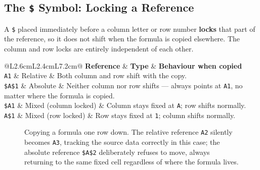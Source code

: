 \documentclass[11pt,a4paper]{article}
\begin{document}
\subsection{The \texttt{\$} Symbol: Locking a Reference}

A \texttt{\$} placed immediately before a column letter or row number \textbf{locks} that part of the reference, so it does not shift when the formula is copied elsewhere. The column and row locks are entirely independent of each other.

\begin{formulasyntax}
\begin{center}
\begin{tabular}{@{}L{2.6cm}L{2.4cm}L{7.2cm}@{}}
\toprule
\textbf{Reference} & \textbf{Type} & \textbf{Behaviour when copied} \\
\midrule
\texttt{A1} & Relative & Both column and row shift with the copy. \\
\texttt{\$A\$1} & Absolute & Neither column nor row shifts --- always points at \texttt{A1}, no matter where the formula is copied. \\
\texttt{\$A1} & Mixed (column locked) & Column stays fixed at \texttt{A}; row shifts normally. \\
\texttt{A\$1} & Mixed (row locked) & Row stays fixed at \texttt{1}; column shifts normally. \\
\bottomrule
\end{tabular}
\end{center}
\end{formulasyntax}

\begin{figure}[htbp]
\centering
{}
\caption{Copying a formula one row down. The relative reference \texttt{A2} silently becomes \texttt{A3}, tracking the source data correctly in this case; the absolute reference \texttt{\$A\$2} deliberately refuses to move, always returning to the same fixed cell regardless of where the formula lives.}
\end{figure}
\end{document}
